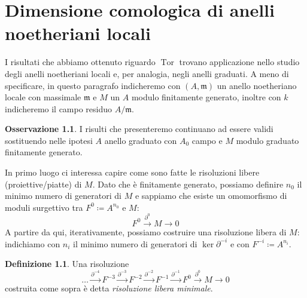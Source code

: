 \documentclass[a4paper,11pt,oneside]{book}
\newcommand{\m}{\mathfrak{m}}
\DeclareMathOperator{\Tor}{Tor}
\theoremstyle{definition}
\newtheorem{de}{Definizione}
\newtheorem{oss}[section]{Osservazione}
\begin{document}
 \chapter{Dimensione comologica di anelli noetheriani locali}
  I risultati che abbiamo ottenuto riguardo $\Tor$ trovano applicazione nello studio degli anelli noetheriani locali
  e, per  analogia, negli anelli graduati. A meno di specificare, in questo paragrafo indicheremo con $(A,\m)$ un anello noetheriano locale
  con massimale $\m$ e $M$ un $A$ modulo finitamente generato, inoltre con $k$ indicheremo il campo residuo $A/\m$.  
  
  \begin{oss}
   I risulti che presenteremo continuano ad essere validi sostituendo nelle ipotesi $A$ anello graduato con $A_0$ campo e $M$ modulo graduato finitamente generato.
  \end{oss}
  
  In primo luogo ci interessa capire come sono fatte le risoluzioni libere (proiettive/piatte) di $M$. Dato che \`e finitamente generato, possiamo definire
  $n_0$ il minimo numero di generatori di $M$ e sappiamo che esiste un omomorfismo di moduli surgettivo tra $F^0\coloneqq A^{n_0}$ e $M$:
  \[
   F^0\xrightarrow{\partial^{0}} M\rightarrow 0
  \]
  A partire da qui, iterativamente, possiamo costruire una risoluzione libera di $M$: indichiamo con $n_i$ il minimo numero di generatori di $\ker \partial^{-i}$
  e con $F^{-i}\coloneqq A^{n_i}$.
  \begin{de}
  Una risoluzione
  \[
    \dots\xrightarrow{\partial^{-4}}F^{-3}\xrightarrow{\partial^{-3}} F^{-2}\xrightarrow{\partial^{-2}} F^{-1}\xrightarrow{\partial^{-1}}F^0\xrightarrow{\partial^{0}} M\rightarrow 0
  \]
  costruita come sopra \`e detta \emph{risoluzione libera minimale}.
  \end{de}
\end{document}
